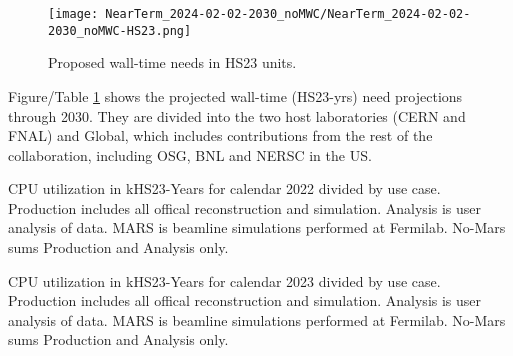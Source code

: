 \documentclass[12pt]{article}
\begin{document}
\begin{figure}[h]
\centering\texttt{[image: NearTerm\_2024-02-02-2030\_noMWC/NearTerm\_2024-02-02-2030\_noMWC-HS23.png]}
\caption{Proposed wall-time needs in  HS23 units. }\label{fig:HS23Main}
\end{figure}


Figure/Table \ref{fig:HS23Main} shows the projected wall-time  (HS23-yrs) need projections through 2030.   They are divided into the two host laboratories (CERN and FNAL) and Global, which includes contributions from the rest of the collaboration, including OSG, BNL and NERSC in the US. 

\begin{table}[ht]
\centering{}
\caption{CPU utilization in kHS23-Years for calendar 2022 divided by use case.   Production includes all offical reconstruction and simulation. Analysis is user analysis of data.  MARS is beamline simulations performed at Fermilab.  No-Mars sums Production and Analysis only.  }
\label{tab:DiskPledges}
\end{table}

\begin{table}[ht]
\centering{}
\caption{CPU utilization in kHS23-Years for calendar 2023 divided by use case.   Production includes all offical reconstruction and simulation. Analysis is user analysis of data.  MARS is beamline simulations performed at Fermilab.  No-Mars sums Production and Analysis only.  }
\label{tab:DiskPledges}
\end{table}

%
%
%
%
%
\end{document}
